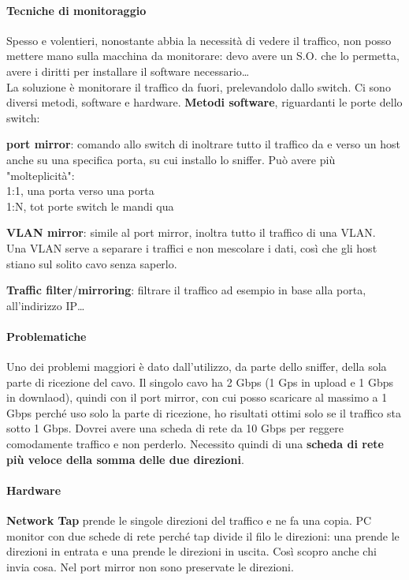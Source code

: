 \documentclass[10pt]{book}
\begin{document}
\paragraph{Tecniche di monitoraggio}
Spesso e volentieri, nonostante abbia la necessità di vedere il traffico, non posso mettere mano sulla macchina da monitorare: devo avere un S.O. che lo permetta, avere i diritti per installare il software necessario\ldots\\
La soluzione è monitorare il traffico da fuori, prelevandolo dallo switch. Ci sono diversi metodi, software e hardware. \textbf{Metodi software}, riguardanti le porte dello switch:
\begin{list}{}{}
	\item \textbf{port mirror}: comando allo switch di inoltrare tutto il traffico da e verso un host anche su una specifica porta, su cui installo lo sniffer. Può avere più "molteplicità":\\
	1:1, una porta verso una porta\\
	1:N, tot porte switch le mandi qua
	\item \textbf{VLAN mirror}: simile al port mirror, inoltra tutto il traffico di una VLAN.\\
	Una VLAN serve a separare i traffici e non mescolare i dati, così che gli host stiano sul solito cavo senza saperlo.
\end{list}
\textbf{Traffic filter}/\textbf{mirroring}: filtrare il traffico ad esempio in base alla porta, all'indirizzo IP\ldots
\paragraph{Problematiche} Uno dei problemi maggiori è dato dall'utilizzo, da parte dello sniffer, della sola parte di ricezione del cavo. Il singolo cavo ha 2 Gbps (1 Gps in upload e 1 Gbps in downlaod), quindi con il port mirror, con cui posso scaricare al massimo a 1 Gbps perché uso solo la parte di ricezione, ho risultati ottimi solo se il traffico sta sotto 1 Gbps. Dovrei avere una scheda di rete da 10 Gbps per reggere comodamente traffico e non perderlo. Necessito quindi di una \textbf{scheda di rete più veloce della somma delle due direzioni}.
\paragraph{Hardware}\textbf{Network Tap} prende le singole direzioni del traffico e ne fa una copia. PC monitor con due schede di rete perché tap divide il filo le direzioni: una prende le direzioni in entrata e una prende le direzioni in uscita. Così scopro anche chi invia cosa. Nel port mirror non sono preservate le direzioni.
\pagebreak
\end{document}
